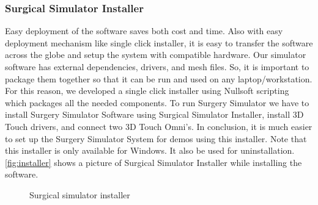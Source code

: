 \subsubsection{Surgical Simulator Installer}
\label{sec:installer}
Easy deployment of the software saves both cost and time. Also with easy deployment mechanism like single click installer, it is easy to transfer the software across the globe and setup the system with compatible hardware. Our simulator software has external dependencies, drivers, and  mesh files. So, it is important to package them together so that it can be run and used on any laptop/workstation. For this reason, we developed a single click installer using Nullsoft scripting which packages all the needed components. To run Surgery Simulator we have to install Surgery Simulator Software using Surgical Simulator Installer, install 3D Touch drivers, and connect two 3D Touch Omni's. In conclusion, it is much easier to set up the Surgery Simulator System for demos using this installer. Note that this installer is only available for Windows. It also be used for uninstallation. \autoref{fig:installer} shows a picture of Surgical Simulator Installer while installing the software.

\begin{figure}
  \centering
  \qquad
  \caption{Surgical simulator installer}
  \label{fig:installer}
\end{figure}

\clearpage%
